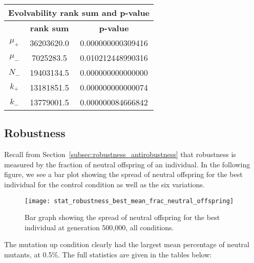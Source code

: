 \begin{table}[H]
	\begin{tabular}{|c|c|c|}
		\hline
		\multicolumn{3}{c}{\Large \textbf{Evolvability rank sum and p-value}} \\
		\hline
		& \textbf{rank sum} & \textbf{p-value} \\
		\hline
		$\mu_+$ & 36203620.0 & 0.000000000309416 \\
		\hline
		$\mu_-$ & 7025283.5 & 0.010212448990316 \\
		\hline
		$N_-$ & 19403134.5 & 0.000000000000000\\
		\hline
		$k_+$ & 13181851.5 & 0.000000000000074 \\
		\hline
		$k_-$ & 13779001.5 & 0.000000084666842 \\
		\hline
	\end{tabular}
\end{table}
\subsection{Robustness}
Recall from Section~\ref{subsec:robustness_antirobustness} that robustness is measured by the fraction of neutral offspring of an individual. In the following figure, we see a bar plot showing the spread of neutral offspring for the best individual for the control condition as well as the six variations. 

\begin{figure}[H]
	\centering
	\texttt{[image: stat\_robustness\_best\_mean\_frac\_neutral\_offspring]}
	\caption[Robustness bar graph]{Bar graph showing the spread of neutral offspring for the best individual at generation 500,000, all conditions.}
	\label{fig:mean_robustness_all_conditions}
\end{figure}
The mutation up condition clearly had the largest mean percentage of neutral mutants, at 0.5\%. The full statistics are given in the tables below:

